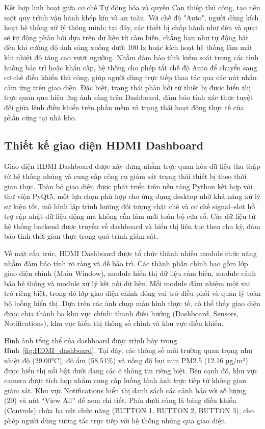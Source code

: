 Kết hợp linh hoạt giữa cơ chế Tự động hóa  và quyền Can thiệp thủ công, tạo nên một quy trình vận hành khép kín và an toàn. Với chế độ "Auto", người dùng kích hoạt hệ thống xử lý thông minh; tại đây, các thiết bị chấp hành như đèn và quạt sẽ tự động phản hồi dựa trên dữ liệu từ cảm biến, chẳng hạn như tự động bật đèn khi cường độ ánh sáng xuống dưới 100 lx hoặc kích hoạt hệ thống làm mát khi nhiệt độ tăng cao vượt ngưỡng. Nhằm đảm bảo tính kiểm soát trong các tình huống bảo trì hoặc khẩn cấp, hệ thống cho phép tắt chế độ Auto để chuyển sang cơ chế điều khiển thủ công, giúp người dùng trực tiếp thao tác qua các nút nhấn cảm ứng trên giao diện. Đặc biệt, trạng thái phản hồi từ thiết bị được hiển thị trực quan qua hiệu ứng ánh sáng trên Dashboard, đảm bảo tính xác thực tuyệt đối giữa lệnh điều khiển trên phần mềm và trạng thái hoạt động thực tế của phần cứng tại nhà kho.

\subsection{Thiết kế giao diện HDMI Dashboard}

Giao diện HDMI Dashboard được xây dựng nhằm trực quan hóa dữ liệu thu thập từ hệ thống nhúng và cung cấp công cụ giám sát trạng thái thiết bị theo thời gian thực. Toàn bộ giao diện được phát triển trên nền tảng Python kết hợp với thư viện PyQt5, một lựa chọn phù hợp cho ứng dụng desktop nhờ khả năng xử lý sự kiện tốt, mô hình lập trình hướng đối tượng chặt chẽ và cơ chế signal–slot hỗ trợ cập nhật dữ liệu động mà không cần làm mới toàn bộ cửa sổ. Các dữ liệu từ hệ thống backend được truyền về dashboard và hiển thị liên tục theo chu kỳ, đảm bảo tính thời gian thực trong quá trình giám sát.

Về mặt cấu trúc, HDMI Dashboard được tổ chức thành nhiều module chức năng nhằm đảm bảo tính rõ ràng và dễ bảo trì. Các thành phần chính bao gồm lớp giao diện chính (Main Window), module hiển thị dữ liệu cảm biến, module cảnh báo hệ thống và module xử lý kết nối dữ liệu. Mỗi module đảm nhiệm một vai trò riêng biệt, trong đó lớp giao diện chính đóng vai trò điều phối và quản lý toàn bộ luồng hiển thị. Dựa trên các ảnh chụp màn hình thực tế, có thể thấy giao diện được chia thành ba khu vực chính: thanh điều hướng (Dashboard, Sensors, Notifications), khu vực hiển thị thông số chính và khu vực điều khiển.

Hình ảnh tổng thể của dashboard được trình bày trong Hình~\ref{fig:HDMI_dashboard}. Tại đây, các thông số môi trường quan trọng như nhiệt độ (29.00°C), độ ẩm (58.51\%) và nồng độ bụi mịn PM2.5 (12.16 µg/m³) được hiển thị nổi bật dưới dạng các ô thông tin riêng biệt. Bên cạnh đó, khu vực camera được tích hợp nhằm cung cấp luồng hình ảnh trực tiếp từ không gian giám sát. Khu vực Notifications hiển thị danh sách các cảnh báo với số lượng (20) và nút “View All” để xem chi tiết. Phía dưới cùng là bảng điều khiển (Controls) chứa ba nút chức năng (BUTTON 1, BUTTON 2, BUTTON 3), cho phép người dùng tương tác trực tiếp với hệ thống nhúng qua giao diện.

